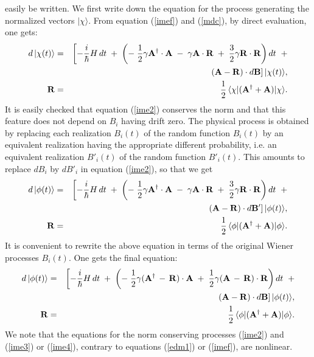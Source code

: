 \documentclass[10pt,a4paper]{article}
\begin{document}
easily be written. We first write down the equation for the
process generating the normalized vectors $| \chi\rangle$. From
equation (\ref{imef}) and (\ref{mdc}), by direct evaluation, one
gets:
\begin{eqnarray} \label{ime2}
d\, |\chi(t)\rangle & = & \left[ -\frac{i}{\hbar} H\, dt \; + \;
\left( - \; \frac{1}{2}\gamma {\bf A}^{\dagger}\cdot {\bf A} \; -
\; \gamma {\bf A}\cdot {\bf R} \; + \; \frac{3}{2} \gamma {\bf R}
\cdot {\bf R} \right) dt \right. \; + \nonumber \\
&  & \left. ( {\bf A} - {\bf R})\cdot d{\bf B} \right]
|\chi(t)\rangle, \\
{\bf R} & = & \frac{1}{2}\, \langle \chi|({\bf A}^{\dagger} + {\bf
A}) |\chi \rangle. \nonumber
\end{eqnarray}
It is easily checked that equation (\ref{ime2}) conserves the norm
and that this feature does not depend on $B_{i}$ having drift
zero. The physical process is obtained by replacing each
realization $B_{i}(t)$ of the random function $B_{i}(t)$ by an
equivalent realization having the appropriate different
probability, i.e. an equivalent realization $B'_{i}(t)$ of the
random function $B'_{i}(t)$. This amounts to replace $dB_{i}$ by
$dB'_{i}$ in equation (\ref{ime2}), so that we get
\begin{eqnarray} \label{ime3}
d\, |\phi(t)\rangle & = & \left[ -\frac{i}{\hbar} H\, dt \; + \;
\left( - \; \frac{1}{2}\gamma {\bf A}^{\dagger}\cdot {\bf A} \; -
\; \gamma {\bf A}\cdot {\bf R} \; + \; \frac{3}{2} \gamma {\bf R}
\cdot {\bf R} \right) dt \right. \; + \nonumber \\
&  & \left. ( {\bf A} - {\bf R})\cdot d{\bf B}' \right]
|\phi(t)\rangle, \\
{\bf R} & = & \frac{1}{2}\, \langle \phi|({\bf A}^{\dagger} + {\bf
A}) |\phi \rangle. \nonumber
\end{eqnarray}
It is convenient to rewrite the above equation in terms of the
original Wiener processes $B_{i}(t)$. One gets the final equation:
\begin{eqnarray} \label{ime4}
d\, |\phi(t)\rangle & = & \left[ -\frac{i}{\hbar} H\, dt \; + \;
\left( - \; \frac{1}{2}\gamma ({\bf A}^{\dagger} \, - \, {\bf
R})\cdot {\bf A} \; + \; \frac{1}{2}\gamma ({\bf A} \, - \,
{\bf R})\cdot {\bf R} \right) dt \right. \; + \nonumber \\
&  & \left. ( {\bf A} - {\bf R})\cdot d{\bf B} \right]
|\phi(t)\rangle, \\
{\bf R} & = & \frac{1}{2}\, \langle \phi|({\bf A}^{\dagger} + {\bf
A}) |\phi \rangle. \nonumber
\end{eqnarray}
We note that the equations for the norm conserving processes
(\ref{ime2}) and (\ref{ime3}) or (\ref{ime4}), contrary to
equations (\ref{edm1}) or (\ref{imef}), are nonlinear.
\end{document}
